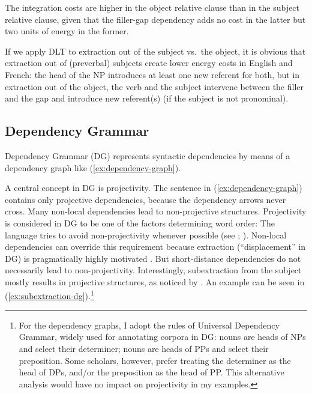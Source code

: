 The integration costs are higher in the object relative clause than in the subject relative clause, given that the filler-gap dependency adds no cost in the latter but two units of energy in the former.

If we apply DLT to extraction out of the subject vs.\ the object, it is obvious that extraction out of (preverbal) subjects create lower energy costs in English and French: the head of the NP introduces at least one new referent for both, but in extraction out of the object, the verb and the subject intervene between the filler and the gap and introduce new referent(s) (if the subject is not pronominal).


\subsection{Dependency Grammar}

Dependency Grammar (DG) represents syntactic dependencies by means of a dependency graph like (\ref{ex:dependency-graph}).

\ea \label{ex:dependency-graph}
\z 

A central concept in DG is projectivity. The sentence in (\ref{ex:dependency-graph}) contains only projective dependencies, because the dependency arrows never cross. Many non-local dependencies lead to non-projective structures. Projectivity is considered in DG to be one of the factors determining word order: The language tries to avoid non-projectivity whenever possible (see \citealt[Section~7.4.2]{Hudson.2010}; \citealt[Section~7.3]{Osborne.2019}). Non-local dependencies can override this requirement because extraction (``displacement'' in DG) is pragmatically highly motivated \citep[Section~7.6.7]{Hudson.2010}. But short-distance dependencies do not necessarily lead to non-projectivity. Interestingly, subextraction from the subject mostly results in projective structures, as noticed by \citet[Section~4.3]{Candito.2012.ldd}. An example can be seen in (\ref{ex:subextraction-dg}).\footnote{For the dependency graphs, I adopt the rules of Universal Dependency Grammar, widely used for annotating corpora in DG: nouns are heads of NPs and select their determiner; nouns are heads of PPs and select their preposition. Some scholars, however, prefer treating the determiner as the head of DPs, and/or the preposition as the head of PP. This alternative analysis would have no impact on projectivity in my examples.}

